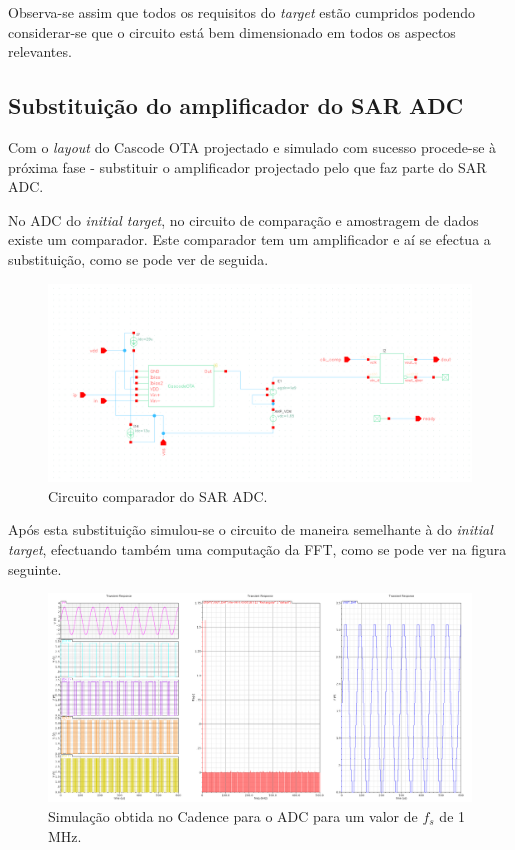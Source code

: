 \documentclass[11pt]{article}
\numberwithin{equation}{section}
\begin{document}
Observa-se assim que todos os requisitos do \textit{target} estão cumpridos podendo considerar-se que o circuito está bem dimensionado em todos os aspectos relevantes.

\subsection{Substituição do amplificador do SAR ADC}

Com o \textit{layout} do Cascode OTA projectado e simulado com sucesso procede-se à próxima fase - substituir o amplificador projectado pelo que faz parte do SAR ADC.

No ADC do \textit{initial target}, no circuito de comparação e amostragem de dados existe um comparador. Este comparador tem um amplificador e aí se efectua a substituição, como se pode ver de seguida.

\begin{figure}[H]
	\centering
	\includegraphics[keepaspectratio=true, scale=0.26]{exps/SAR}
	\vspace{-0.5em}
	\caption{Circuito comparador do SAR ADC.}
	\vspace{-0.8em} 
\end{figure}

Após esta substituição simulou-se o circuito de maneira semelhante à do \textit{initial target}, efectuando também uma computação da FFT, como se pode ver na figura seguinte.

\begin{figure}[H]
	\centering
	\includegraphics[keepaspectratio=true, scale=0.27]{exps/GraficosDoLayoutDAC}
	\vspace{-0.5em}
	\caption{Simulação obtida no Cadence para o ADC para um valor de $f_s$ de 1 MHz.}
	\vspace{-0.8em} 
\end{figure}
\end{document}
